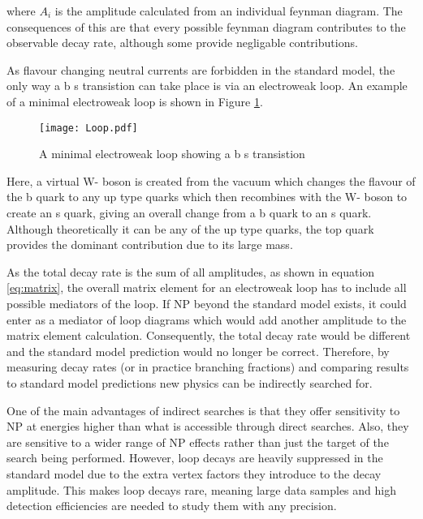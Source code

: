 where $A_i$ is the amplitude calculated from an individual feynman diagram.  The consequences of this are that every possible feynman diagram contributes to the observable decay rate, although some provide negligable contributions.

As flavour changing neutral currents are forbidden in the standard model, the only way a b \to s transistion can take place is via an electroweak loop.  An example of a minimal electroweak loop is shown in Figure \ref{fig:loop}.
\begin{figure}
  \centering
  \texttt{[image: Loop.pdf]}
  \caption{A minimal electroweak loop showing a b \to s transistion}
  \label{fig:loop}
\end{figure}
Here, a virtual W- boson is created from the vacuum which changes the flavour of the b quark to any up type quarks which then recombines with the W- boson to create an s quark, giving an overall change from a b quark to an s quark.  Although theoretically it can be any of the up type quarks, the top quark provides the dominant contribution due to its large mass.

As the total decay rate is the sum of all amplitudes, as shown in equation \ref{eq:matrix}, the overall matrix element for an electroweak loop has to include all possible mediators of the loop.  If NP beyond the standard model exists, it could enter as a mediator of loop diagrams which would add another amplitude to the matrix element calculation.  Consequently, the total decay rate would be different and the standard model prediction would no longer be correct.  Therefore, by measuring decay rates (or in practice branching fractions) and comparing results to standard model predictions new physics can be indirectly searched for.

One of the main advantages of indirect searches is that they offer sensitivity to NP at energies higher than what is accessible through direct searches.  Also, they are sensitive to a wider range of NP effects rather than just the target of the search being performed.  However, loop decays are heavily suppressed in the standard model due to the extra vertex factors they introduce to the decay amplitude.  This makes loop decays rare, meaning large data samples and high detection efficiencies are needed to study them with any precision.








